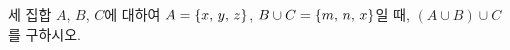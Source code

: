 세 집합 $A$, $B$, $C$에 대하여 $A=\{x,\mkern3mu y,\mkern3mu z\}$, $B\cup C=\{m,\mkern3mu n,\mkern3mu x\}$일 때, $(A\cup B)\cup C$를 구하시오.
